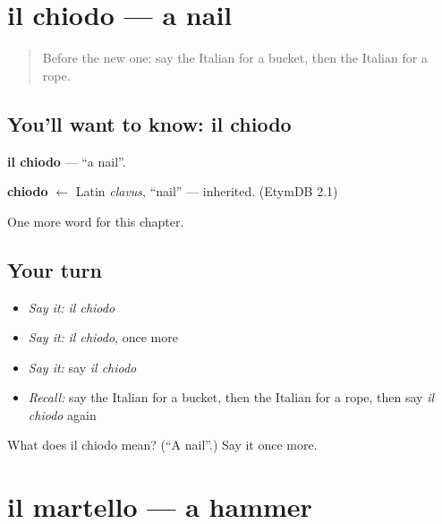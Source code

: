 \section[il chiodo]{il chiodo — a nail}

\label{lesson:IT-C99-chiodo}



\begin{quote}
Before the new one: say the Italian for a bucket, then the Italian for a rope.
\end{quote}

\subsection*{You'll want to know: il chiodo}
\textbf{il chiodo} — \textquotedblleft{}a nail\textquotedblright{}.

\begin{cousinweb}
\textbf{chiodo} $\leftarrow$ Latin \emph{clavus}, \textquotedblleft{}nail\textquotedblright{} — inherited. (EtymDB 2.1)
\end{cousinweb}

\begin{grammarlens}[title={What you've built}]
One more word for this chapter.
\end{grammarlens}

\subsection*{Your turn}
\begin{itemize}
\raggedright
  \item \emph{Say it:} \emph{il chiodo}
  \item \emph{Say it:} \emph{il chiodo}, once more
  \item \emph{Say it:} say \emph{il chiodo}
  \item \emph{Recall:} say the Italian for a bucket, then the Italian for a rope, then say \emph{il chiodo} again
\end{itemize}

\begin{tcolorbox}[breakable,colback=teal!4,colframe=teal!35!black,title={Before you move on}]
What does il chiodo mean? (\textquotedblleft{}A nail\textquotedblright{}.) Say it once more.
\end{tcolorbox}
\section[il martello]{il martello — a hammer}

